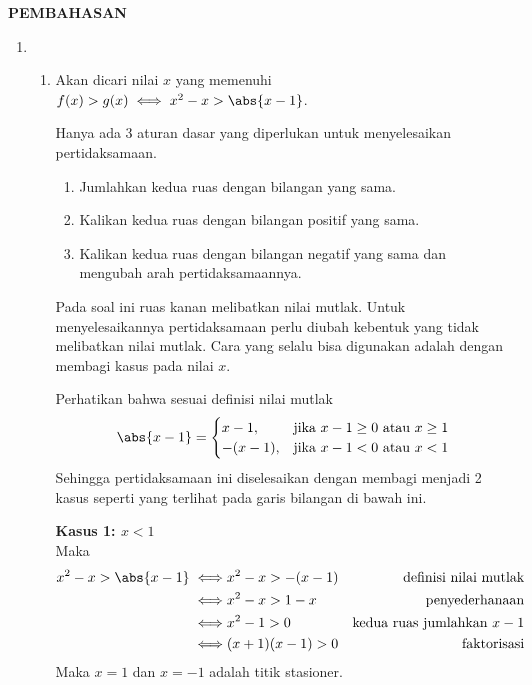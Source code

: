\begin{center}
    \textbf{\large{PEMBAHASAN}}
\end{center}
\begin{enumerate}[leftmargin=*, label={\arabic*}.]
\item
\begin{enumerate}[label={\alph*}.]
\item Akan dicari nilai $x$ yang memenuhi
$f(x) > g(x) \iff x^{2}-x > \abs{x-1}$.

\vspace{0.1cm}
Hanya ada 3 aturan dasar yang diperlukan untuk menyelesaikan pertidaksamaan.
\begin{enumerate}[label={\arabic*})]
    \item Jumlahkan kedua ruas dengan bilangan yang sama.
    \item Kalikan kedua ruas dengan bilangan positif yang sama.
    \item Kalikan kedua ruas dengan bilangan negatif yang sama dan 
    mengubah arah pertidaksamaannya.
\end{enumerate}
Pada soal ini ruas kanan melibatkan nilai mutlak. Untuk menyelesaikannya 
pertidaksamaan perlu diubah kebentuk yang tidak melibatkan nilai mutlak. Cara yang 
selalu bisa digunakan adalah dengan membagi kasus pada nilai $x$.
    
Perhatikan bahwa sesuai definisi nilai mutlak
\[
\abs{x-1} = 
\begin{cases}
    x-1, &\text{jika $x-1 \geq 0$ atau $x \geq 1$}\\
    -(x-1), &\text{jika $x-1 < 0$ atau $x < 1$}
\end{cases}
\]
Sehingga pertidaksamaan ini diselesaikan dengan membagi menjadi 2 kasus 
seperti yang terlihat pada garis bilangan di bawah ini.
    
\vspace{0.2cm}
    
\textbf{Kasus 1: $x < 1$}\\
Maka
\begin{align*}
    x^{2}-x > \abs{x-1}
    \iff &x^{2}-x > -(x-1)
    &\text{definisi nilai mutlak} \\
    \iff &x^{2}-x > 1-x
    &\text{penyederhanaan}\\
    \iff &x^{2} - 1 > 0
    &\text{kedua ruas jumlahkan $x-1$}\\
    \iff &(x+1)(x-1) > 0
    &\text{faktorisasi}
\end{align*}
Maka $x=1$ dan $x=-1$ adalah titik stasioner.


\end{enumerate}
\end{enumerate}

